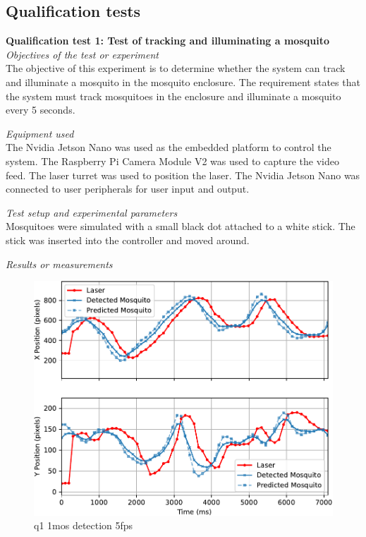 \subsection{Qualification tests}
\textbf{Qualification test 1: Test of tracking and illuminating a mosquito}\\

\textit{Objectives of the test or experiment}\\
The objective of this experiment is to determine whether the system can track and illuminate a mosquito in the mosquito enclosure. The requirement states that the system must track mosquitoes in the enclosure and illuminate a mosquito every 5 seconds.

\textit{Equipment used}\\
The Nvidia Jetson Nano was used as the embedded platform to control the system. The Raspberry Pi Camera Module V2 was used to capture the video feed. The laser turret was used to position the laser. The Nvidia Jetson Nano was connected to user peripherals for user input and output.

\textit{Test setup and experimental parameters}\\
Mosquitoes were simulated with a small black dot attached to a white stick. The stick was inserted into the controller and moved around.

\textit{Results or measurements}\\
\begin{figure}[h]
  \centering
  \includegraphics[width=\textwidth]{figures/results/q1_1mos_detection_5fps.pdf}
  \caption{q1 1mos detection 5fps}
  \label{fig:q1_1mos_detection_5fps}
\end{figure}


